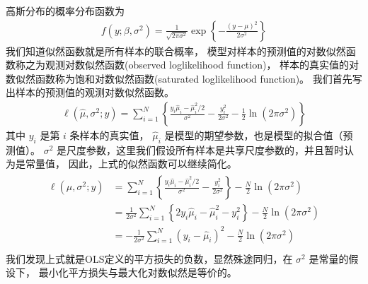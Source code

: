\documentclass[letterpaper,10pt,english]{sphinxmanual}
\begin{document}
高斯分布的概率分布函数为
\begin{equation}\label{equation:高斯模型/content:高斯模型/content:17}
\begin{split}f(y;\beta,\sigma^2) =\frac{1}{\sqrt{2\pi \sigma^2}} \exp \left \{ - \frac{(y-\mu)^2}{2\sigma^2} \right \}\end{split}
\end{equation}
我们知道似然函数就是所有样本的联合概率，
模型对样本的预测值的对数似然函数称之为观测对数似然函数(observed log\sphinxhyphen{}likelihood function)，
样本的真实值的对数似然函数称为饱和对数似然函数(saturated log\sphinxhyphen{}likelihood function)。
我们首先写出样本的预测值的观测对数似然函数。
\begin{equation}\label{equation:高斯模型/content:高斯模型/content:18}
\begin{split}\ell(\hat{\mu},\sigma^2;y)=\sum_{i=1}^N \left \{ \frac{y_i \hat{\mu}_i - \hat{\mu}_i^2/2}{\sigma^2} -
\frac{y_i^2}{2\sigma^2} - \frac{1}{2} \ln (2\pi\sigma^2) \right \}\end{split}
\end{equation}
其中 \(y_i\) 是第 \(i\) 条样本的真实值，
\(\hat{\mu}_i\) 是模型的期望参数，也是模型的拟合值（预测值）。
\(\sigma^2\) 是尺度参数，这里我们假设所有样本是共享尺度参数的，并且暂时认为是常量值，
因此，上式的似然函数可以继续简化。
\begin{align}\label{equation:高斯模型/content:高斯模型/content:19}\!\begin{aligned}
\ell(\hat{\mu},\sigma^2;y) &=\sum_{i=1}^N \left \{ \frac{y_i \hat{\mu}_i - \hat{\mu}_i^2/2}{\sigma^2} -
\frac{y_i^2}{2\sigma^2}  \right \}  - \frac{N}{2} \ln (2\pi\sigma^2)\\
&= \frac{1}{2\sigma^2}\sum_{i=1}^N \left \{ 2 y_i \hat{\mu}_i - \hat{\mu}_i^2 -
y_i^2 \right \}  - \frac{N}{2} \ln (2\pi\sigma^2)\\
&= - \frac{1}{2\sigma^2}\sum_{i=1}^N   (y_i-\hat{\mu}_i)^2   - \frac{N}{2} \ln (2\pi\sigma^2)\\
\end{aligned}\end{align}
我们发现上式就是OLS定义的平方损失的负数，显然殊途同归，在 \(\sigma^2\) 是常量的假设下，
最小化平方损失与最大化对数似然是等价的。
\end{document}
